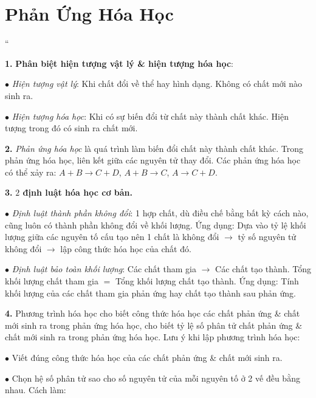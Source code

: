\documentclass{article}
\numberwithin{equation}{section}
\begin{document}

\section{Phản Ứng Hóa Học}
``\begin{enumerate*}
	\item[\textbf{1.}] \textbf{Phân biệt hiện tượng vật lý \& hiện tượng hóa học}:
	\begin{enumerate*}
		\item[$\bullet$] \textit{Hiện tượng vật lý}: Khi chất đổi về thể hay hình dạng. Không có chất mới nào sinh ra.
		\item[$\bullet$] \textit{Hiện tượng hóa học}: Khi có sự biến đổi từ chất này thành chất khác. Hiện tượng trong đó có sinh ra chất mới.
	\end{enumerate*}
	\item[\textbf{2.}] \textit{Phản ứng hóa học} là quá trình làm biến đổi chất này thành chất khác. Trong phản ứng hóa học, liên kết giữa các nguyên tử thay đổi. Các phản ứng hóa học có thể xảy ra: $A + B\to C + D$, $A + B\to C$, $A\to C + D$.
	\item[\textbf{3.}] \textbf{$2$ định luật hóa học cơ bản.}
	\begin{enumerate*}
		\item[$\bullet$] \textit{Định luật thành phần không đổi}: 1 hợp chất, dù điều chế bằng bất kỳ cách nào, cũng luôn có thành phần không đổi về khối lượng. Ứng dụng: Dựa vào tỷ lệ khối lượng giữa các nguyên tố cấu tạo nên 1 chất là không đổi $\to$ tỷ số nguyên tử không đổi $\to$ lập công thức hóa học của chất đó.
		\item[$\bullet$] \textit{Định luật bảo toàn khối lượng}: Các chất tham gia $\to$ Các chất tạo thành. Tổng khối lượng chất tham gia $=$ Tổng khối lượng chất tạo thành. Ứng dụng: Tính khối lượng của các chất tham gia phản ứng hay chất tạo thành sau phản ứng.
	\end{enumerate*}
	\item[\textbf{4.}] Phương trình hóa học cho biết công thức hóa học các chất phản ứng \& chất mới sinh ra trong phản ứng hóa học, cho biết tỷ lệ số phân tử chất phản ứng \& chất mới sinh ra trong phản ứng hóa học. Lưu ý khi lập phương trình hóa học:
	\begin{enumerate*}
		\item[$\bullet$] Viết đúng công thức hóa học của các chất phản ứng \& chất mới sinh ra.
		\item[$\bullet$] Chọn hệ số phân tử sao cho số nguyên tử của mỗi nguyên tố ở 2 vế đều bằng nhau. Cách làm:

\end{enumerate*}
\end{enumerate*}
\end{document}
